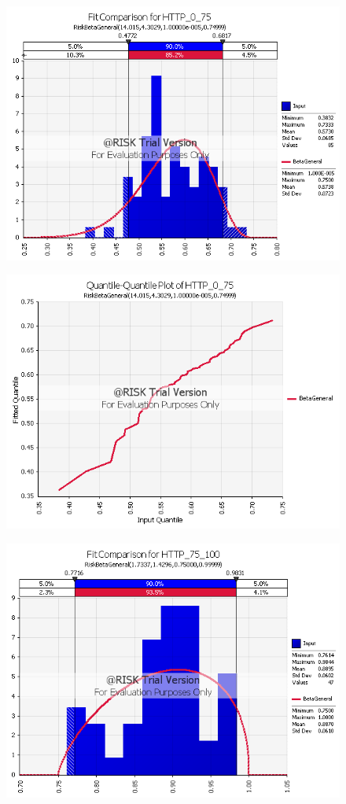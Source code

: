 \documentclass{article}
\begin{document}
\begin{figure}[htbp]
\includegraphics[scale=0.70]{HTTP_0_75_Beta_Graph.png}
\centering
\end{figure}
\begin{figure}[htbp]
\includegraphics[scale=0.70]{HTTP_0_75_Beta_QQ.png}
\centering
\end{figure}
\begin{figure}[htbp]
\includegraphics[scale=0.70]{HTTP_75_100_Beta_Graph.png}
\centering
\end{figure}
\end{document}

